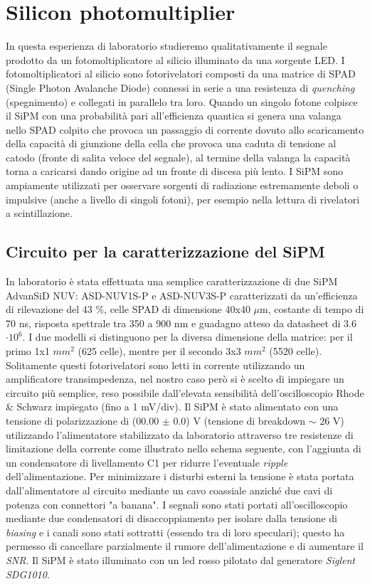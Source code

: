 \documentclass[journal]{IEEEtran}
\begin{document}

\section{Silicon photomultiplier} %
In questa esperienza di laboratorio studieremo qualitativamente il segnale prodotto da un fotomoltiplicatore al silicio illuminato da una sorgente LED. I fotomoltiplicatori al silicio sono fotorivelatori composti da una matrice di SPAD (Single Photon Avalanche Diode) connessi in serie a una resistenza di \textit{quenching} (spegnimento) e collegati in parallelo tra loro. Quando un singolo fotone colpisce il SiPM con una probabilità pari all'efficienza quantica si genera una valanga nello SPAD colpito che provoca un passaggio di corrente dovuto allo scaricamento della capacità di giunzione della cella che provoca una caduta di tensione al catodo (fronte di salita veloce del segnale), al termine della valanga la capacità torna a caricarsi dando origine ad un fronte di discesa più lento. I SiPM sono ampiamente utilizzati per osservare sorgenti di radiazione estremamente deboli o impulsive (anche a livello di singoli fotoni), per esempio nella lettura di rivelatori a scintillazione.

\subsection{Circuito per la caratterizzazione del SiPM}
In laboratorio è stata effettuata una semplice caratterizzazione di due SiPM AdvanSiD NUV: ASD-NUV1S-P e ASD-NUV3S-P caratterizzati da un'efficienza di rilevazione del 43 \%, celle SPAD di dimensione 40x40 $\mu$m, costante di tempo di 70 ns, risposta spettrale tra 350 a 900 nm e guadagno atteso da datasheet di 3.6 $\cdot 10^6$. I due modelli si distinguono per la diversa dimensione della matrice: per il primo 1x1 $mm^2$ (625 celle), mentre per il secondo 3x3 $mm^2$ (5520 celle). Solitamente questi fotorivelatori sono letti in corrente utilizzando un amplificatore transimpedenza, nel nostro caso però si è scelto di impiegare un circuito più semplice, reso possibile dall'elevata sensibilità dell'oscilloscopio Rhode & Schwarz impiegato (fino a 1 mV/div). Il SiPM è stato alimentato con una tensione di polarizzazione di (00.00 $\pm$ 0.0) V (tensione di breakdown $\sim$ 26 V) utilizzando l'alimentatore stabilizzato da laboratorio attraverso tre resistenze di limitazione della corrente come illustrato nello schema seguente, con l'aggiunta di un condensatore di livellamento C1 per ridurre l'eventuale \textit{ripple} dell'alimentazione. Per minimizzare i disturbi esterni la tensione è stata portata dall'alimentatore al circuito mediante un cavo coassiale anziché due cavi di potenza con connettori "a banana". I segnali sono stati portati all'oscilloscopio mediante due condensatori di disaccoppiamento per isolare dalla tensione di \textit{biasing} e i canali sono stati sottratti (essendo tra di loro speculari); questo ha permesso di cancellare parzialmente il rumore dell'alimentazione e di aumentare il \textit{SNR}. Il SiPM è stato illuminato con un led rosso pilotato dal generatore \textit{Siglent SDG1010}.
\end{document}
